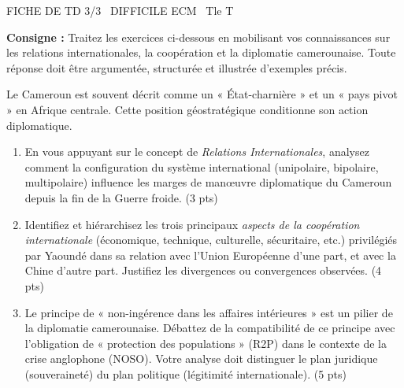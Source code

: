 \documentclass[11pt]{article}
\begin{document}
\begin{tcolorbox}[enhanced,colback=popink,colframe=popink,arc=10pt,boxrule=0pt,left=12pt,right=12pt,top=9pt,bottom=9pt]
{\color{white}\popxbold\small FICHE DE TD 3/3 \textbullet\ DIFFICILE \hfill ECM \textbullet\ Tle T\par}
\end{tcolorbox}
\vspace{4pt}
\noindent\textbf{Consigne :} Traitez les exercices ci-dessous en mobilisant vos connaissances sur les relations internationales, la coopération et la diplomatie camerounaise. Toute réponse doit être argumentée, structurée et illustrée d'exemples précis.

\begin{exercice}
Le Cameroun est souvent décrit comme un « État-charnière » et un « pays pivot » en Afrique centrale. Cette position géostratégique conditionne son action diplomatique.
\begin{enumerate}
    \item En vous appuyant sur le concept de \textit{Relations Internationales}, analysez comment la configuration du système international (unipolaire, bipolaire, multipolaire) influence les marges de manœuvre diplomatique du Cameroun depuis la fin de la Guerre froide. (3 pts)
    \item Identifiez et hiérarchisez les trois principaux \textit{aspects de la coopération internationale} (économique, technique, culturelle, sécuritaire, etc.) privilégiés par Yaoundé dans sa relation avec l'Union Européenne d'une part, et avec la Chine d'autre part. Justifiez les divergences ou convergences observées. (4 pts)
    \item Le principe de « non-ingérence dans les affaires intérieures » est un pilier de la diplomatie camerounaise. Débattez de la compatibilité de ce principe avec l'obligation de « protection des populations » (R2P) dans le contexte de la crise anglophone (NOSO). Votre analyse doit distinguer le plan juridique (souveraineté) du plan politique (légitimité internationale). (5 pts)
\end{enumerate}
\end{exercice}
\end{document}
